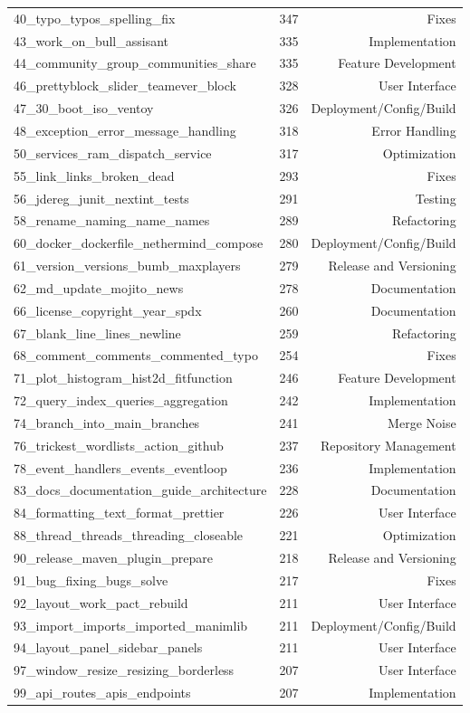 \begin{table}[t]
{\begin{tabular}{lrr}
40\_typo\_typos\_spelling\_fix & 347 & Fixes \\
43\_work\_on\_bull\_assisant & 335 & Implementation \\
44\_community\_group\_communities\_share & 335 & Feature Development \\
46\_prettyblock\_slider\_teamever\_block & 328 & User Interface \\
47\_30\_boot\_iso\_ventoy & 326 & Deployment/Config/Build \\
48\_exception\_error\_message\_handling & 318 & Error Handling \\
50\_services\_ram\_dispatch\_service & 317 & Optimization \\
55\_link\_links\_broken\_dead & 293 & Fixes \\
56\_jdereg\_junit\_nextint\_tests & 291 & Testing \\
58\_rename\_naming\_name\_names & 289 & Refactoring \\
60\_docker\_dockerfile\_nethermind\_compose & 280 & Deployment/Config/Build \\
61\_version\_versions\_bumb\_maxplayers & 279 & Release and Versioning \\
62\_md\_update\_mojito\_news & 278 & Documentation \\
66\_license\_copyright\_year\_spdx & 260 & Documentation \\
67\_blank\_line\_lines\_newline & 259 & Refactoring \\
68\_comment\_comments\_commented\_typo & 254 & Fixes \\
71\_plot\_histogram\_hist2d\_fitfunction & 246 & Feature Development \\
72\_query\_index\_queries\_aggregation & 242 & Implementation \\
74\_branch\_into\_main\_branches & 241 & Merge Noise \\
76\_trickest\_wordlists\_action\_github & 237 & Repository Management \\
78\_event\_handlers\_events\_eventloop & 236 & Implementation \\
83\_docs\_documentation\_guide\_architecture & 228 & Documentation \\
84\_formatting\_text\_format\_prettier & 226 & User Interface \\
88\_thread\_threads\_threading\_closeable & 221 & Optimization \\
90\_release\_maven\_plugin\_prepare & 218 & Release and Versioning \\
91\_bug\_fixing\_bugs\_solve & 217 & Fixes \\
92\_layout\_work\_pact\_rebuild & 211 & User Interface \\
93\_import\_imports\_imported\_manimlib & 211 & Deployment/Config/Build \\
94\_layout\_panel\_sidebar\_panels & 211 & User Interface \\
97\_window\_resize\_resizing\_borderless & 207 & User Interface \\
99\_api\_routes\_apis\_endpoints & 207 & Implementation \\
\bottomrule
\end{tabular}
}
\label{tab:commit_messages_topics}
\end{table}
